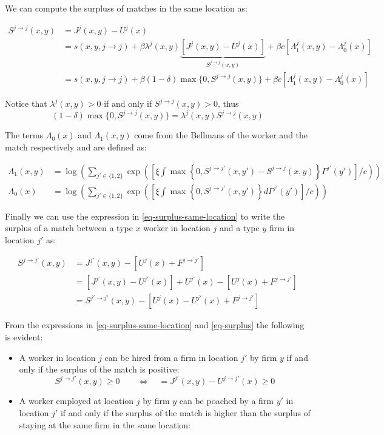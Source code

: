 \documentclass[
  letterpaper,
  DIV=11,
  numbers=noendperiod]{scrartcl}
\providecommand{\tightlist}{%
  \setlength{\itemsep}{0pt}\setlength{\parskip}{0pt}}\usepackage{longtable,booktabs,array}
\begin{document}
We can compute the surpluss of matches in the same location as:

\begin{align}
S^{j \to j}(x,y) &= J^j(x, y) - U^{j}(x) \nonumber \\
& = s(x,y,j \to j) + \beta \lambda^j(x,y)\underbrace{\left[J^j(x,y) - U^j(x)\right]}_{S^{j\to j}(x,y)} + \beta c \left[ \Lambda^j_1(x, y) - \Lambda^j_0(x)\right]  \nonumber\\
& = s(x,y,j \to j) + \beta (1-\delta)\max\{0, S^{j\to j}(x,y)\} + \beta c \left[ \Lambda^j_1(x, y) - \Lambda^j_0(x)\right] \label{eq-surplus-same-location}
\end{align}

Notice that \(\lambda^{j}(x,y) > 0\) if and only if
\(S^{j\to j}(x,y) > 0\), thus
\[(1-\delta)\max\{0, S^{j\to j}(x,y)\} =\lambda^{j}(x,y) S^{j\to j}(x,y) \]

The terms \(\Lambda_0(x)\) and \(\Lambda_1(x,y)\) come from the Bellmans
of the worker and the match respectively and are defined as:

\begin{align*}
\Lambda_1(x, y) &= \log \left(\sum_{j'\in\{1,2\}}\exp{\left(\left[\xi \int \max\left\{0, S^{j\to j' }(x,y')-S^{j \to j}(x,y) \right\}\Gamma^{j'}(y') \right] / c\right)} \right)  \\
\Lambda_0(x) &= \log \left(\sum_{j'\in\{1,2\}}\exp{\left(\left[\xi \int \max\left\{0, S^{j\to j' }(x,y') \right\}d\Gamma^{j'}(y') \right] / c\right)}\right)
\end{align*}

Finally we can use the expression in \eqref{eq-surplus-same-location} to
write the surplus of a match between a type \(x\) worker in location
\(j\) and a type \(y\) firm in location \(j'\) as:

\begin{align}
S^{j \to j'}(x,y) &= J^{j'}(x, y) - \left[U^{j}(x) + F^{j \to j'}\right] \nonumber \\
& = [J^{j'}(x, y) - U^{j'}(x)] + U^{j'}(x) - \left[U^{j}(x) + F^{j \to j'}\right] \nonumber \\
& = S^{j'\to j'}(x,y) - [U^{j}(x) - U^{j'}(x) + F^{j \to j'}] \label{eq-surplus}
\end{align}

From the expressions in \eqref{eq-surplus-same-location} and
\eqref{eq-surplus} the following is evident:

\begin{itemize}
\tightlist
\item
  A worker in location \(j\) can be hired from a firm in location \(j'\)
  by firm \(y\) if and only if the surplus of the match is positive:
  \[S^{j\to j'}(x,y) \geq 0 \qquad \iff \quad = J^{j'}(x,y) - U^{j\to j'}(x) \geq 0\]
\item
  A worker employed at location \(j\) by firm \(y\) can be poached by a
  firm \(y'\) in location \(j'\) if and only if the surplus of the match
  is higher than the surplus of staying at the same firm in the same
  location:
\end{itemize}
\end{document}
